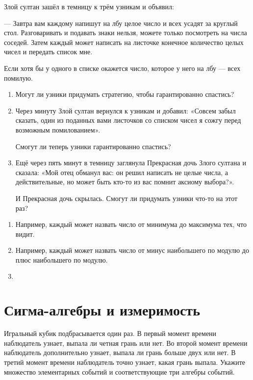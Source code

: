 \begin{problem}
Злой султан зашёл в темницу к трём узникам и объявил: 

— Завтра вам каждому напишут на лбу целое число и всех усадят за круглый стол. 
Разговаривать и подавать знаки нельзя, можете только посмотреть на числа соседей.
Затем каждый может написать на листочке конечное количество целых чисел и передать список мне. 

Если хотя бы у одного в списке окажется число, которое у него на лбу — всех помилую.

\begin{enumerate}
  \item Могут ли узники придумать стратегию, чтобы гарантированно спастись?
  \item Через минуту Злой султан вернулся к узникам и добавил: 
  «Совсем забыл сказать, один из поданных вами листочков со списком чисел я сожгу перед возможным помилованием».

  Смогут ли теперь узники гарантированно спастись?
  \item Ещё через пять минут в темницу заглянула Прекрасная дочь Злого султана и сказала:
  «Мой отец обманул вас: он решил написать не целые числа, а действительные, но может быть кто-то из вас помнит аксиому выбора?». 

  И Прекрасная дочь скрылась. Смогут ли придумать узники что-то на этот раз?
\end{enumerate}


\begin{sol}
  \begin{enumerate}
    \item Например, каждый может назвать число от минимума до максимума тех, что видит. 
    \item Например, каждый может назвать число от минус наибольшего по модулю до плюс наибольшего по модулю. 
    \item 
  \end{enumerate}
\end{sol}
\end{problem}


\section{Сигма-алгебры и измеримость}

\begin{problem}
Игральный кубик подбрасывается один раз. В первый момент времени
наблюдатель узнает, выпала ли четная грань или нет. Во второй
момент времени наблюдатель дополнительно узнает, выпала ли грань больше двух
или нет. В третий момент времени наблюдатель точно узнает, какая
грань выпала. Укажите множество элементарных событий и
соответствующие три алгебры событий.


\begin{sol}


\end{sol}
\end{problem}

